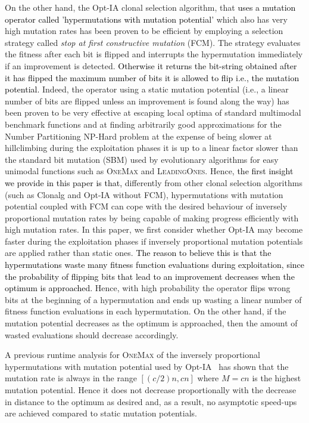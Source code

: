 \documentclass[lettersize,journal]{IEEEtran}
\newcommand{\new}[1]{\textcolor{black}{#1}}
\newcommand{\rerev}[1]{\textcolor{black}{#1}}
\begin{document}
On the other hand, the Opt-IA clonal selection algorithm, that \new{uses a mutation operator called 'hypermutations with mutation potential'} which also has very high mutation rates has been proven to be efficient by employing a selection strategy called {\it stop at first constructive mutation} (FCM). The strategy evaluates the fitness after each bit is flipped and interrupts the hypermutation immediately if an improvement is detected. \new {Otherwise it returns the bit-string obtained after it has flipped the maximum number of  bits it is allowed to flip i.e., the mutation potential.} 
Indeed, the operator using a static mutation potential (i.e., a linear number of bits are flipped unless an improvement is found along the way) has been proven to be very effective at escaping local
optima of standard multimodal benchmark functions \cite{CorusOlivetoYazdani2019TCS} and at finding arbitrarily good approximations for the Number Partitioning NP-Hard problem \cite{CorusOlivetoYazdaniPPSN2018Approx,CorusOlivetoYazdaniAIJ2019} at the expense
of being slower at hillclimbing during the exploitation phases \rerev{\textemdash} it is up to a linear factor slower than the standard bit mutation (SBM) used by evolutionary algorithms for easy unimodal functions such as \textsc{OneMax} and \textsc{LeadingOnes}.
Hence, \new{the first insight we provide in this paper is that,} differently from other clonal selection algorithms (such as Clonalg and Opt-IA without FCM), hypermutations with mutation potential coupled with FCM can cope with the desired behaviour of inversely proportional mutation rates by being capable of making progress efficiently with high mutation rates. 
In this paper, we first consider whether Opt-IA may become faster during the exploitation phases if inversely proportional mutation potentials are applied rather than static ones.
\new{The reason to believe this is that the hypermutations waste many fitness function evaluations during exploitation, since the probability of flipping bits that lead to an improvement decreases when the optimum is approached.} 
Hence, with high probability the operator flips wrong bits at the beginning of a hypermutation and ends up wasting a linear number
of fitness function evaluations in each hypermutation. On the other hand, if the mutation potential decreases as the optimum is approached, 
then the amount of wasted evaluations should decrease accordingly.

A previous runtime analysis for \textsc{OneMax} of the inversely proportional hypermutations with mutation potential used by Opt-IA~\cite{JansenZarges2011} has shown that the mutation rate is always in the range $[(c/2)n, cn]$ where $M=cn$ is the highest mutation potential. Hence it does not decrease proportionally with the decrease in distance to the optimum as desired and, as a result, no asymptotic speed-ups are achieved compared to static mutation potentials. 
\end{document}
